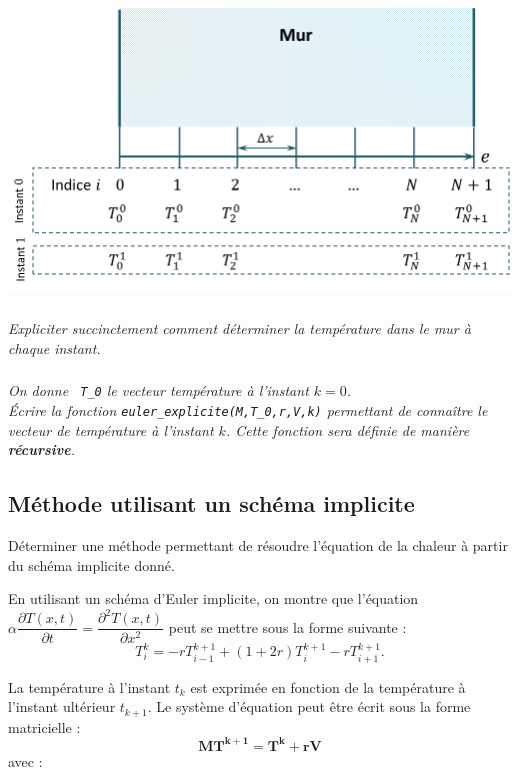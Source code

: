 \documentclass[10pt,fleqn]{article} %
\begin{document}
\begin{center}
\includegraphics[width=0.5\linewidth]{images/figure_03}
\end{center}

\subparagraph{}
\textit{Expliciter succinctement comment déterminer la température dans le mur à chaque instant.}

\ifprof
\begin{corrige}
\end{corrige}
\else
\fi

\subparagraph{}
\textit{On donne \texttt{ T\_0} le vecteur température à l'instant $k=0$. \\
Écrire la fonction \texttt{euler\_explicite(M,T\_0,r,V,k)} permettant de connaître le vecteur de température à l'instant $k$. Cette fonction sera définie de manière \textbf{récursive}.}

\ifprof
\begin{corrige}
\end{corrige}
\else
\fi




\subsection{Méthode utilisant un schéma implicite}

\begin{obj}
Déterminer une méthode permettant de résoudre l'équation de la chaleur à partir du schéma implicite donné.
\end{obj}

En utilisant un schéma d'Euler implicite, on montre que l'équation $\alpha \dfrac{\partial T(x,t)}{\partial t} = \dfrac{\partial^2 T(x,t)}{\partial x^2}$ peut se mettre sous la forme suivante : 
$$
T_i^k = -rT_{i-1}^{k+1} + \left( 1+2r\right) T_{i}^{k+1}-rT_{i+1}^{k+1}.
$$

La température à l'instant $t_k$ est exprimée en fonction de la température à l'instant ultérieur $t_{k+1}$.
Le système d'équation peut être écrit sous la forme matricielle : 
\begin{equation} \label{eq_implicite}
\mathbf{M T^{k+1} = T^k + rV}
\end{equation}
avec : 
\end{document}
